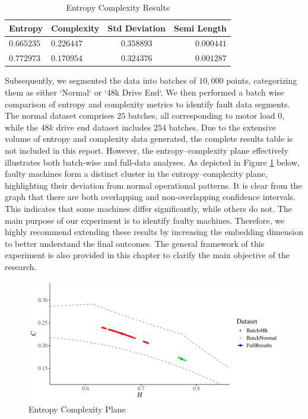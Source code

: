 \begin{table}[H]
	\centering
	\begin{tabular}{llcr}
		\toprule
		Entropy  & Complexity  & Std Deviation & Semi Length \\
		\midrule
		$0.665235$ & $0.226447$ & $0.358893$ & $0.000441$\\ 
		$0.772973$ & $0.170954$ & $0.324376$ & $0.001287$\\
		\bottomrule
	\end{tabular}
	\caption{Entropy Complexity Results}
	\label{tab:EnComplexResults}
\end{table}

Subsequently, we segmented the data into batches of $10,000$ points, categorizing them as either `Normal` or `48k Drive End`. We then performed a batch wise comparison of entropy and complexity metrics to identify fault data segments. 
The normal dataset comprises $25$ batches, all corresponding to motor load $0$, while the $48k$ drive end dataset includes $254$ batches. Due to the extensive volume of entropy and complexity data generated, the complete results table is not included in this report. However, the entropy–complexity plane effectively illustrates both batch-wise and full-data analyses. As depicted in Figure \ref{fig:EntopyComplexity Plane} below, faulty machines form a distinct cluster in the entropy–complexity plane, highlighting their deviation from normal operational patterns. 
It is clear from the graph that there are both overlapping and non-overlapping confidence intervals. This indicates that some machines differ significantly, while others do not. The main purpose of our experiment is to identify faulty machines. Therefore, we highly recommend extending these results by increasing the embedding dimension to better understand the final outcomes. The general framework of this experiment is also provided in this chapter to clarify the main objective of the research.

\begin{figure}[hbt]
	\centering
	\includegraphics[width=0.8 \textwidth]{confidence_interval}
	\caption{Entropy Complexity Plane}
	\label{fig:EntopyComplexity Plane}
\end{figure}

